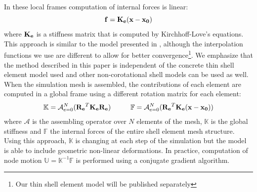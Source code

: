 In these local frames computation of internal forces is linear:
\begin{equation}
  \mathbf{f} = \mathbf{K_e}(\mathbf{x} - \mathbf{x_0})
  \label{linear_static_model} 
\end{equation}
where $\mathbf{K_e}$ is a stiffness matrix that is computed by Kirchhoff-Love's equations. This approach is similar to the model presented in  \cite{Comas2010b,Comas2010c}, although the interpolation functions we use are different to allow for better convergence\footnote{Our thin shell element model will be published separately}. We emphasize that the method described in this paper is independent of the concrete thin shell element model used and other non-corotational shell models can be used as well. When the simulation mesh is assembled, the contributions of each element are computed in a global frame using a different rotation matrix for each element:
\begin{equation}
\mathbb{K} = \mathcal{A}_{e=0}^N (\mathbf{R_e}^T \mathbf{K_e} \mathbf{R_e}) \hspace{10mm}
\mathbb{F} = \mathcal{A}_{e=0}^N ( \mathbf{R_e}^T \mathbf{K_e}(\myvec{x} - \myvec{x_0}))
\end{equation}
where $\mathcal{A}$ is the assembling operator over $N$ elements of the mesh, $\mathbb{K}$ is the global stiffness and $\mathbb{F}$ the internal forces of the entire shell element mesh structure. Using this approach, $\mathbb{K}$ is changing at each step of the simulation but the model is able to include geometric non-linear deformations. In practice, computation of node motion $\mathbb{U} = \mathbb{K}^{-1} \mathbb{F}$ is performed using a conjugate gradient algorithm.



